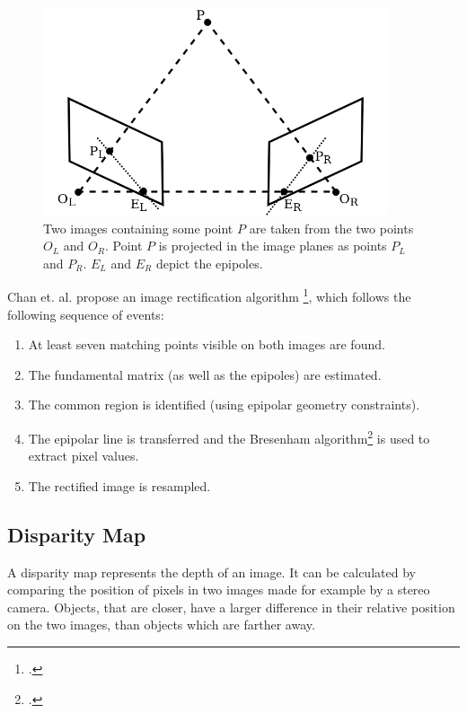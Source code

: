\begin{figure}[h!]
	\centering
	\includegraphics[width=4in]{img/methodology_stereoCamera_imageRectification.png}
	\caption{Two images containing some point $P$ are taken from the two points $O_L$ and $O_R$. Point $P$ is projected in the image planes as points $P_L$ and $P_R$. $E_L$ and $E_R$ depict the epipoles.}
	\label{pic:methodology_stereoCamera_imageRectification}
\end{figure}

Chan et. al. propose an image rectification algorithm \footcite{Chen_New_Image_Rectification_Algorithm}, which follows the following sequence of events:

\begin{enumerate}
	\item At least seven matching points visible on both images are found.
	\item The fundamental matrix (as well as the epipoles) are estimated.
	\item The common region is identified (using epipolar geometry constraints).
	\item The epipolar line is transferred and the Bresenham algorithm\footcite{Bresenham_Linear_Algorithm_For_Incremental_Digital_Display_Of_Circular_Arcs} is used to extract pixel values.
	\item The rectified image is resampled.
\end{enumerate}

\subsection{Disparity Map}
A disparity map represents the depth of an image. It can be calculated by comparing the position of pixels in two images made for example by a stereo camera. Objects, that are closer, have a larger difference in their relative position on the two images, than objects which are farther away.

